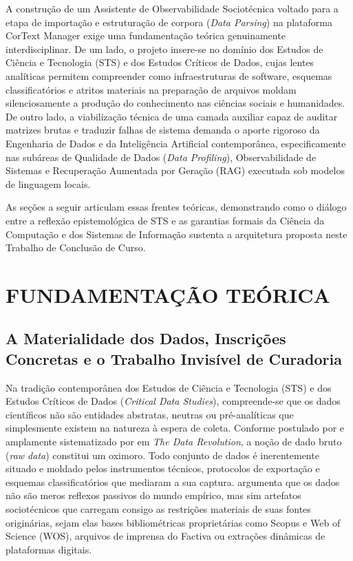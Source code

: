 \documentclass[
	oneside,
	a4paper,
	12pt,
	chapter=TITLE,
	section=TITLE,
	english,
	brazilian
]{abntex2}
\begin{document}
A construção de um Assistente de Observabilidade Sociotécnica voltado para a etapa de importação e estruturação de corpora (\textit{Data Parsing}) na plataforma CorText Manager exige uma fundamentação teórica genuinamente interdisciplinar. De um lado, o projeto insere-se no domínio dos Estudos de Ciência e Tecnologia (STS) e dos Estudos Críticos de Dados, cujas lentes analíticas permitem compreender como infraestruturas de software, esquemas classificatórios e atritos materiais na preparação de arquivos moldam silenciosamente a produção do conhecimento nas ciências sociais e humanidades. De outro lado, a viabilização técnica de uma camada auxiliar capaz de auditar matrizes brutas e traduzir falhas de sistema demanda o aporte rigoroso da Engenharia de Dados e da Inteligência Artificial contemporânea, especificamente nas subáreas de Qualidade de Dados (\textit{Data Profiling}), Observabilidade de Sistemas e Recuperação Aumentada por Geração (RAG) executada sob modelos de linguagem locais.

As seções a seguir articulam essas frentes teóricas, demonstrando como o diálogo entre a reflexão epistemológica de STS e as garantias formais da Ciência da Computação e dos Sistemas de Informação sustenta a arquitetura proposta neste Trabalho de Conclusão de Curso.

\FloatBarrier
\section{FUNDAMENTAÇÃO TEÓRICA}\label{sec:fundamentacao_teorica}


\FloatBarrier
\subsection{A Materialidade dos Dados, Inscrições Concretas e o Trabalho Invisível de Curadoria}\label{sec:a_materialidade_dos_dados_inscricoes_con}


Na tradição contemporânea dos Estudos de Ciência e Tecnologia (STS) e dos Estudos Críticos de Dados (\textit{Critical Data Studies}), compreende-se que os dados científicos não são entidades abstratas, neutras ou pré-analíticas que simplesmente existem na natureza à espera de coleta. Conforme postulado por  e amplamente sistematizado por  em \textit{The Data Revolution}, a noção de dado bruto (\textit{raw data}) constitui um oximoro. Todo conjunto de dados é inerentemente situado e moldado pelos instrumentos técnicos, protocolos de exportação e esquemas classificatórios que mediaram a sua captura.  argumenta que os dados não são meros reflexos passivos do mundo empírico, mas sim artefatos sociotécnicos que carregam consigo as restrições materiais de suas fontes originárias, sejam elas bases bibliométricas proprietárias como Scopus e Web of Science (WOS), arquivos de imprensa do Factiva ou extrações dinâmicas de plataformas digitais.
\end{document}
